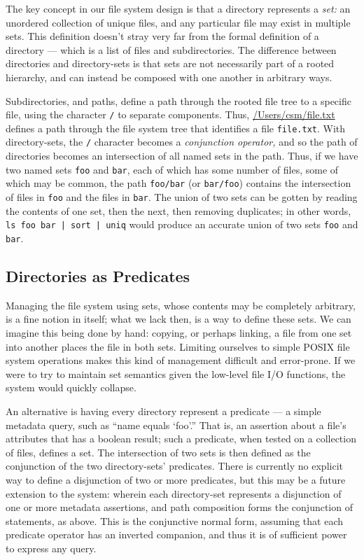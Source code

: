 \documentclass{article}
\begin{document}
The key concept in our file system design is that a directory
represents a \emph{set:} an unordered collection of unique files, and
any particular file may exist in multiple sets. This definition
doesn't stray very far from the formal definition of a directory ---
which is a list of files and subdirectories. The difference between
directories and directory-sets is that sets are not necessarily part
of a rooted hierarchy, and can instead be composed with one another in
arbitrary ways.

Subdirectories, and paths, define a path through the rooted file tree
to a specific file, using the character \texttt{/} to separate
components. Thus, \url{/Users/csm/file.txt} defines a path through
the file system tree that identifies a file \texttt{file.txt}. With
directory-sets, the \texttt{/} character becomes a \emph{conjunction
  operator,} and so the path of directories becomes an intersection of
all named sets in the path. Thus, if we have two named sets
\texttt{foo} and \texttt{bar}, each of which has some number of files,
some of which may be common, the path \texttt{foo/bar} (or
\texttt{bar/foo}) contains the intersection of files in \texttt{foo}
and the files in \texttt{bar}. The union of two sets can be gotten by
reading the contents of one set, then the next, then removing
duplicates; in other words, \texttt{ls foo bar | sort | uniq} would
produce an accurate union of two sets \texttt{foo} and \texttt{bar}.

\subsection{Directories as Predicates}

Managing the file system using sets, whose contents may be completely
arbitrary, is a fine notion in itself; what we lack then, is a way to
define these sets. We can imagine this being done by hand: copying, or
perhaps linking, a file from one set into another places the file in
both sets. Limiting ourselves to simple POSIX file system operations
makes this kind of management difficult and error-prone. If we were to
try to maintain set semantics given the low-level file I/O functions,
the system would quickly collapse.

An alternative is having every directory represent a predicate --- a
simple metadata query, such as ``name equals `foo'.'' That is, an
assertion about a file's attributes that has a boolean result; such a
predicate, when tested on a collection of files, defines a set. The
intersection of two sets is then defined as the conjunction of the two
directory-sets' predicates. There is currently no explicit way to
define a disjunction of two or more predicates, but this may be a
future extension to the system: wherein each directory-set represents
a disjunction of one or more metadata assertions, and path composition
forms the conjunction of statements, as above. This is the conjunctive
normal form, assuming that each predicate operator has an inverted
companion, and thus it is of sufficient power to express any query.
\end{document}
